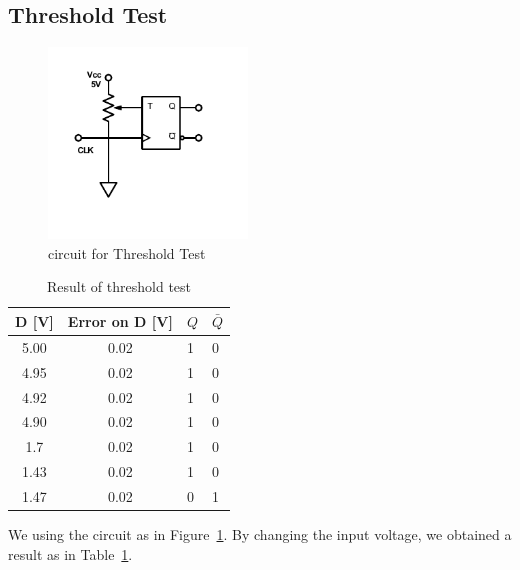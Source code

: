 \documentclass[aps,prl,reprint]{revtex4-1}
\begin{document}
    \subsection{Threshold Test}
        \begin{figure}[h]
            \centering
            \includegraphics[height=2in]{image/Threshold-Test.pdf}
            \caption{circuit for Threshold Test}
            \label{fig:thresholdTest}
        \end{figure}
        \begin{table}[h]
        \centering
        \begin{tabular}{c c p{0.5in}<{\centering} p{0.5in}<{\centering}} 
        D {[}V{]} & Error on D {[}V{]} & $Q$ & $\bar Q$ \\ \hline\hline
        5.00      & 0.02               & 1 & 0        \\ \hline
        4.95      & 0.02               & 1 & 0        \\ \hline
        4.92      & 0.02               & 1 & 0        \\ \hline
        4.90      & 0.02               & 1 & 0        \\ \hline
        1.7       & 0.02               & 1 & 0        \\ \hline
        1.43      & 0.02               & 1 & 0        \\ \hline
        1.47      & 0.02               & 0 & 1        \\ \hline
        \end{tabular}
        \caption{Result of threshold test}
        \label{tb:threshold}
        \end{table}
        We using the circuit as in Figure~\ref{fig:thresholdTest}. By changing the input voltage, we obtained a result as in Table~\ref{tb:threshold}.
\end{document}
